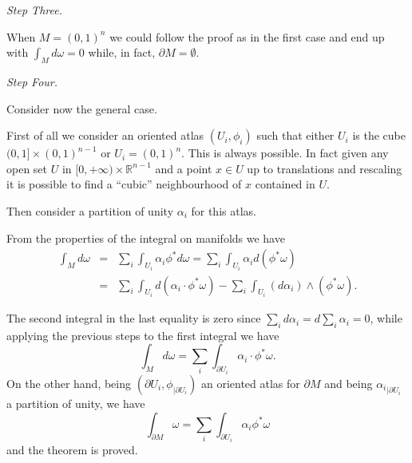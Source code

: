 \documentclass[12pt]{article}
\begin{document}
\emph{Step Three.}

When $M=(0,1)^n$ we could follow the proof as in the first case
and end up with
$\int_M d \omega = 0$ 
while, in fact, $\partial
M=\emptyset$.

\emph{Step Four.}

Consider now the general case.

First of all we consider an oriented atlas $(U_i,\phi_i)$ such that either 
$U_i$ is the cube
$(0,1]\times (0,1)^{n-1}$ or $U_i=(0,1)^n$. 
This is always possible. In fact given any open set $U$ in $[0,+\infty)\times
\mathbb R^{n-1}$ and a point $x\in U$ up to translations and rescaling it is possible
to find a ``cubic'' neighbourhood of $x$ contained in $U$.

Then consider a partition of unity $\alpha_i$ for this atlas.

From the properties of the integral on manifolds we have
\begin{eqnarray*}
        \int_{M} d \omega
        &=& \sum_i \int_{U_i} \alpha_i \phi^* d \omega
        = \sum_i \int_{U_i} \alpha_i d (\phi^* \omega) \\
        &=& \sum_i \int_{U_i} d (\alpha_i\cdot \phi^*\omega)
                - \sum_i \int_{U_i} (d\alpha_i)\wedge(\phi^*\omega).
\end{eqnarray*}

The second integral in the last equality is zero since
$\sum_i
d\alpha_i= d \sum_i \alpha_i = 0$, while applying the previous steps to the first integral we have
\[
        \int_{M} d\omega = \sum_i \int_{\partial U_i}\alpha_i\cdot
        \phi^*\omega.
\]
On the other hand, being
$(\partial U_i,\phi_{|\partial U_i})$ an oriented atlas for $\partial M$ and being ${\alpha_i}_{|\partial U_i}$ a partition of unity, we have
\[
        \int_{\partial M} \omega
        = \sum_i \int_{\partial U_i} \alpha_i \phi^* \omega
\]
and the theorem is proved.
\end{document}
